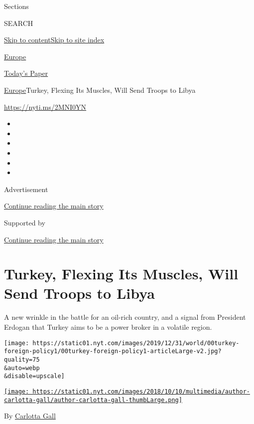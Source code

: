 Sections

SEARCH

\protect\hyperlink{site-content}{Skip to
content}\protect\hyperlink{site-index}{Skip to site index}

\href{https://www.nytimes.com/section/world/europe}{Europe}

\href{https://myaccount.nytimes.com/auth/login?response_type=cookie\&client_id=vi}{}

\href{https://www.nytimes.com/section/todayspaper}{Today's Paper}

\href{/section/world/europe}{Europe}\textbar{}Turkey, Flexing Its
Muscles, Will Send Troops to Libya

\url{https://nyti.ms/2MNI0YN}

\begin{itemize}
\item
\item
\item
\item
\item
\item
\end{itemize}

Advertisement

\protect\hyperlink{after-top}{Continue reading the main story}

Supported by

\protect\hyperlink{after-sponsor}{Continue reading the main story}

\hypertarget{turkey-flexing-its-muscles-will-send-troops-to-libya}{%
\section{Turkey, Flexing Its Muscles, Will Send Troops to
Libya}\label{turkey-flexing-its-muscles-will-send-troops-to-libya}}

A new wrinkle in the battle for an oil-rich country, and a signal from
President Erdogan that Turkey aims to be a power broker in a volatile
region.

\texttt{[image: https://static01.nyt.com/images/2019/12/31/world/00turkey-foreign-policy1/00turkey-foreign-policy1-articleLarge-v2.jpg?quality=75\\\&auto=webp\\\&disable=upscale]}

\href{https://www.nytimes.com/by/carlotta-gall}{\texttt{[image: https://static01.nyt.com/images/2018/10/10/multimedia/author-carlotta-gall/author-carlotta-gall-thumbLarge.png]}}

By \href{https://www.nytimes.com/by/carlotta-gall}{Carlotta Gall}

